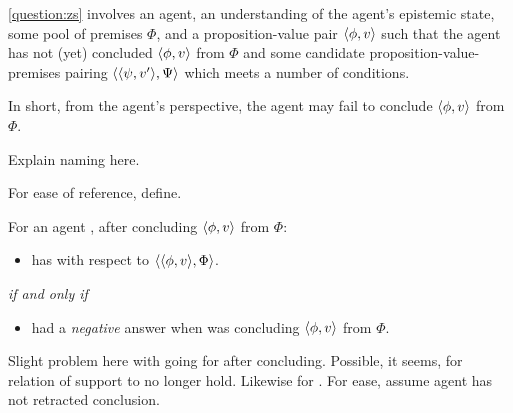 \begin{note}
  \autoref{question:zs} involves an agent, an understanding of the agent's epistemic state, some pool of premises \(\Phi\), and a proposition-value pair \(\langle \phi, v \rangle\) such that the agent has not (yet) concluded \(\langle \phi, v \rangle\) from \(\Phi\) and some candidate proposition-value-premises pairing \(\langle \langle \psi, v' \rangle, \Psi \rangle\) which meets a number of conditions.

  In short, from the agent's perspective, the agent may fail to conclude \(\langle \phi, v \rangle\) from \(\Phi\).
\end{note}

\begin{note}[Naming]
  {
    \color{red}
    Explain naming here.
  }
\end{note}

\begin{note}
  For ease of reference, define.
  \begin{definition}[\izS{}]
    \label{idea:zS}
    For an agent \vAgent{}, after concluding \(\langle \phi, v \rangle\) from \(\Phi\):
    \begin{itemize}
    \item
      \vAgent{} has \zS{} with respect to \(\langle \langle \phi, v \rangle, \Phi \rangle\).
    \end{itemize}

    \emph{if and only if}

    \begin{itemize}
    \item
       had a \emph{negative} answer when \vAgent{} was concluding \(\langle \phi, v \rangle\) from \(\Phi\).
    \end{itemize}
  \end{definition}

  Slight problem here with going for after concluding.
  Possible, it seems, for relation of support to no longer hold.
  Likewise for \zS{}.
  For ease, assume agent has not retracted conclusion.
\end{note}

